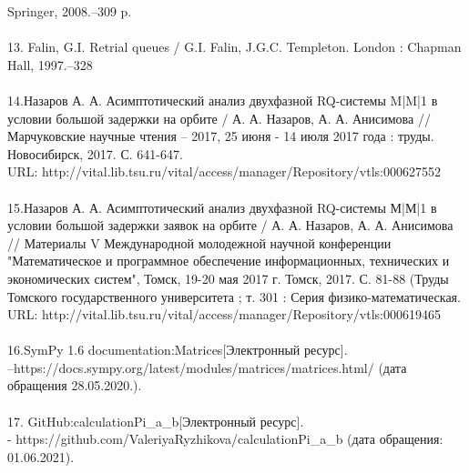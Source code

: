 Springer, 2008.–309 p.\\
\\
13. Falin, G.I. Retrial queues / G.I. Falin, J.G.C. Templeton. London : Chapman Hall, 1997.–328 \\
\\
14.Назаров А. А. Асимптотический анализ двухфазной RQ-системы M|M|1 в условии большой задержки на орбите / А. А. Назаров, А. А. Анисимова // Марчуковские научные чтения – 2017, 25 июня - 14 июля 2017 года : труды. Новосибирск, 2017. С. 641-647.\\ URL: http://vital.lib.tsu.ru/vital/access/manager/Repository/vtls:000627552\\
\\
15.Назаров А. А. Асимптотический анализ двухфазной RQ-системы М|М|1 в условии большой задержки заявок на орбите / А. А. Назаров, А. А. Анисимова // Материалы V Международной молодежной научной конференции "Математическое и программное обеспечение информационных, технических и экономических систем", Томск, 19-20 мая 2017 г. Томск, 2017. С. 81-88 (Труды Томского государственного университета ; т. 301 : Серия физико-математическая. \\URL: http://vital.lib.tsu.ru/vital/access/manager/Repository/vtls:000619465\\
\\
16.SymPy 1.6 documentation:Matrices[Электронный ресурс].\\ –https://docs.sympy.org/latest/modules/matrices/matrices.html/  (дата обращения 28.05.2020.).\\
\\
17. GitHub:calculationPi\_a\_b[Электронный ресурс].\\-  https://github.com/ValeriyaRyzhikova/calculationPi\_a\_b (дата обращения: 01.06.2021).